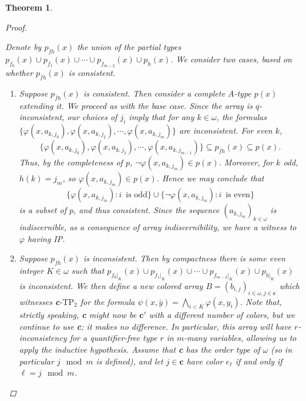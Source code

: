 \documentclass{article}
\newcommand{\TPii}{\text{TP}_2}
\newcommand{\vphi}{\varphi}
\newtheorem{theorem}{Theorem}
\theoremstyle{definition}
\theoremstyle{definition}
\theoremstyle{definition}
\theoremstyle{definition}
\begin{document}
\begin{theorem}
\begin{proof}
\begin{center}
\end{center}

    Denote by $p_{\bar{f}h}(x)$ the union of the partial types $p_{f_0}(x)\cup p_{f_1}(x)\cup\dotsm\cup p_{f_{m-2}}(x)\cup p_h(x)$. We consider two cases, based on whether $p_{\bar{f}h}(x)$ is consistent.

    \begin{enumerate}
        \item Suppose $p_{\bar{f}h}(x)$ is consistent. Then consider a complete $A$-type $p(x)$ extending it. We proceed as with the base case. Since the array is $q$-inconsistent, our choices of $j_i$ imply that for any $k\in\omega$, the formulas $\{\vphi(x, a_{k,j_0}),
        \vphi(x, a_{k,j_2}),\dotsm, \vphi (x, a_{k, j_{m}})\}$ are inconsistent. For even $k$, $$\{\vphi(x, a_{k,j_0}),
        \vphi(x, a_{k,j_2}),\dotsm, \vphi (x, a_{k, j_{m-1}})\}\subseteq p_{\bar{f}h}(x)\subseteq p(x).$$ Thus, by the completeness of $p$, $\neg \vphi(x,a_{k,j_{m}})\in p(x)$. Moreover, for $k$ odd, $h(k)=j_m$, so $\vphi(x,a_{k,j_m})\in p(x)$. Hence we may conclude that $$\{\vphi(x, a_{k,j_{m}})\colon i\enspace\text{is odd}\}\cup \{\neg\vphi(x, a_{k,j_{m}})\colon i\enspace\text{is even}\}$$ is a subset of $p$, and thus consistent. Since the sequence $(a_{k,j_{m}})_{k\in\omega}$ is indiscernible, as a consequence of array indiscernibility, we have a witness to $\vphi$ having IP.

        \item Suppose $p_{\bar{f}h}(x)$ is inconsistent. Then by compactness there is some even integer $K\in\omega$ such that $p_{f_0|_K}(x)\cup p_{f_1|_K}(x)\cup\dotsm\cup p_{f_{m-2}|_K}(x)\cup p_{h|_K}(x)$ is inconsistent. We then define a new colored array $B=(b_{i,j})_{i\in\omega, j\in\textbf{c}}$ which witnesses \textbf{c}-$\TPii$ for the formula $\psi(x, \bar{y})=\bigwedge_{i<K}\vphi(x,y_i)$. Note that, strictly speaking, \textbf{c} might now be $\textbf{c}'$ with a different number of colors, but we continue to use \textbf{c}; it makes no difference. In particular, this array will have $r$-inconsistency for a quantifier-free type $r$ in $m$-many variables, allowing us to apply the inductive hypothesis. Assume that \textbf{c} has the order type of $\omega$ (so in particular $j\mod m$ is defined), and let $j\in \textbf{c}$ have color $e_\ell$ if and only if $\ell=j\mod m$.


\end{enumerate}
\end{proof}
\end{theorem}
\end{document}
